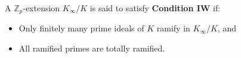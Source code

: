 A $\mathbb{Z}_p$-extension $K_{\infty}/K$ is said to satisfy \textbf{Condition IW} if:
\begin{itemize}
\item Only finitely many prime ideals of $K$ ramify in $K_{\infty}/K$, and
\item All ramified primes are totally ramified.
\end{itemize}

